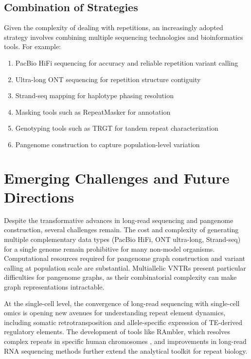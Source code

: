 \subsection{Combination of Strategies}

Given the complexity of dealing with repetitions, an increasingly adopted strategy involves combining multiple sequencing technologies and bioinformatics tools. For example:

\begin{enumerate}
\item PacBio HiFi sequencing for accuracy and reliable repetition variant calling
\item Ultra-long ONT sequencing for repetition structure contiguity
\item Strand-seq mapping for haplotype phasing resolution
\item Masking tools such as RepeatMasker for annotation
\item Genotyping tools such as TRGT for tandem repeat characterization
\item Pangenome construction to capture population-level variation
\end{enumerate}

\section{Emerging Challenges and Future Directions}

Despite the transformative advances in long-read sequencing and pangenome construction, several challenges remain. The cost and complexity of generating multiple complementary data types (PacBio HiFi, ONT ultra-long, Strand-seq) for a single genome remain prohibitive for many non-model organisms. Computational resources required for pangenome graph construction and variant calling at population scale are substantial. Multiallelic VNTRs present particular difficulties for pangenome graphs, as their combinatorial complexity can make graph representations intractable.

At the single-cell level, the convergence of long-read sequencing with single-cell omics is opening new avenues for understanding repeat element dynamics, including somatic retrotransposition and allele-specific expression of TE-derived regulatory elements. The development of tools like RAmbler, which resolves complex repeats in specific human chromosomes \parencite{chakravarty2025}, and improvements in long-read RNA sequencing methods further extend the analytical toolkit for repeat biology.

